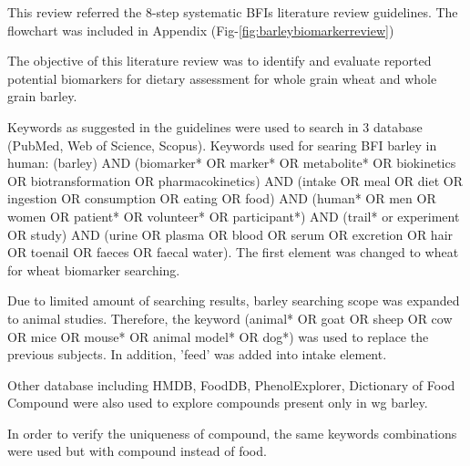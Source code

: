 This review referred the 8-step systematic BFIs literature review guidelines\cite{Pratico2018}. The flowchart was included in Appendix (Fig-\ref{fig:barleybiomarkerreview})

The objective of this literature review was to identify and evaluate reported potential biomarkers for dietary assessment for whole grain wheat and whole grain barley.

Keywords as suggested in the guidelines\cite{Pratico2018} were used to search in 3 database (PubMed, Web of Science, Scopus). Keywords used for searing BFI barley in human: 
(barley) AND (biomarker* OR marker* OR metabolite* OR biokinetics OR biotransformation OR pharmacokinetics) AND (intake OR meal OR diet OR ingestion OR consumption OR eating OR food) AND 
(human* OR men OR women OR patient* OR volunteer* OR participant*) AND 
(trail* or experiment OR study) AND (urine OR plasma OR blood OR serum OR excretion OR hair OR toenail OR faeces OR faecal water). The first element was changed to wheat for wheat biomarker searching. 

Due to limited amount of searching results, barley searching scope was expanded to animal studies. Therefore, the keyword (animal* OR goat OR sheep OR cow OR mice OR mouse* OR animal model* OR dog*) was used to replace the previous subjects. In addition, 'feed' was added into intake element.

Other database including HMDB\cite{hmdb}, FoodDB\cite{foodb}, PhenolExplorer\cite{phenolexplorer}, Dictionary of Food Compound\cite{dictionary} were also used to explore compounds present only in \acrshort{wg} barley. 

In order to verify the uniqueness of compound, the same keywords combinations were used but with compound instead of food.